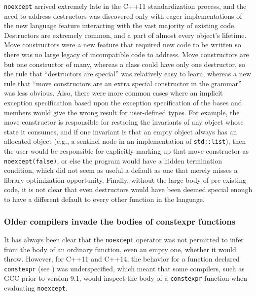 \lstinline!noexcept! arrived extremely late in the C++11 standardization
process, and the need to address destructors was discovered only with
eager implementations of the new language feature interacting with the
vast majority of existing code. Destructors are extremely common, and a
part of almost every object's lifetime. Move constructors were a new
feature that required new code to be written so there was no large
legacy of incompatible code to address. Move constructors are but one
constructor of many, whereas a class could have only one destructor, so
the rule that ``destructors are special'' was relatively easy to learn,
whereas a new rule that ``move constructors are an extra special
constructor in the grammar'' was less obvious. Also, there were more
common cases where an implicit exception specification based upon the
exception specification of the bases and members would give the wrong
result for user-defined types. For example, the move constructor is
responsible for restoring the invariants of any object whose state it
consumes, and if one invariant is that an empty object always has an
allocated object (e.g., a sentinel node in an implementation of
\lstinline!std::list!), then the user would be responsible for explicitly
marking up that move constructor as \lstinline!noexcept(false)!, or else
the program would have a hidden termination condition, which did not
seem as useful a default as one that merely misses a library
optimization opportunity. Finally, without the large body of
pre-existing code, it is not clear that even destructors would have been
deemed special enough to have a different default to every other
function in the language.

\subsubsection[Older compilers invade the bodies of \lstinline!constexpr! functions]{Older compilers invade the bodies of {\SubsubsecCode constexpr} functions}\label{older-compilers-invade-the-bodies-of-constexpr-functions}

It has always been clear that the \lstinline!noexcept! operator was not
permitted to infer from the body of an ordinary function, even an empty
one, whether it would throw. However, for C++11 and C++14, the behavior
for a function declared \lstinline!constexpr! (see ) was underspecified, which meant that some compilers, such
as GCC prior to version 9.1, would inspect the body of a
\lstinline!constexpr! function when evaluating \lstinline!noexcept!.


